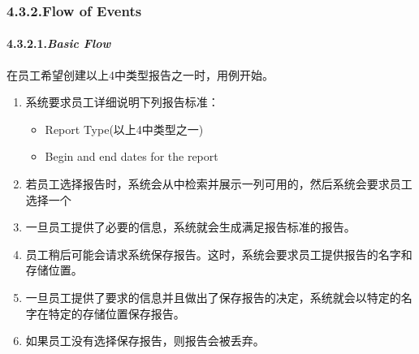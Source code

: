 \documentclass{article}
\begin{document}
\subsubsection{4.3.2.\hspace*{0.5em}Flow of Events}\label{sec-flow-of-events}%

\paragraph{4.3.2.1.\hspace*{0.5em}\emph{Basic Flow}}\label{sec-_basic-flow_}%

\noindent{}\mdbr
{}在员工希望创建以上4中类型报告之一时，用例开始。%

\begin{enumerate}[noitemsep,topsep=\mdcompacttopsep]%

\item{}系统要求员工详细说明下列报告标准：

\begin{itemize}[noitemsep,topsep=\mdcompacttopsep]%

\item{}Report Type(以上4中类型之一)%

\item{}Begin and end dates for the report%
\end{itemize}%

\item{}若员工选择报告时，系统会从中检索并展示一列可用的，然后系统会要求员工选择一个%

\item{}一旦员工提供了必要的信息，系统就会生成满足报告标准的报告。%

\item{}员工稍后可能会请求系统保存报告。这时，系统会要求员工提供报告的名字和存储位置。%

\item{}一旦员工提供了要求的信息并且做出了保存报告的决定，系统就会以特定的名字在特定的存储位置保存报告。%

\item{}如果员工没有选择保存报告，则报告会被丢弃。%
\end{enumerate}%
\end{document}
